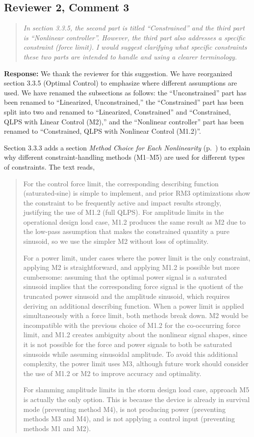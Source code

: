 \documentclass[11pt]{article}
\newcommand{\rcomment}[2]{\subsection*{#1}\begin{quote}\itshape #2\end{quote}}
\newcommand{\response}{\noindent\textbf{Response:} }
\begin{document}
\rcomment{Reviewer 2, Comment 3}{In section 3.3.5, the second part is titled ``Constrained'' and the third part is ``Nonlinear controller''. However, the third part also addresses a specific constraint (force limit). I would suggest clarifying what specific constraints these two parts are intended to handle and using a clearer terminology.}
\response We thank the reviewer for this suggestion.
We have reorganized section 3.3.5 (Optimal Control) to emphasize where different assumptions are used. 
We have renamed the subsections as follows:
the ``Unconstrained'' part has been renamed to ``Linearized, Unconstrained,''
the ``Constrained'' part has been split into two and renamed to ``Linearized, Constrained'' and ``Constrained, QLPS with Linear Control (M2),''
and
the ``Nonlinear controller'' part has been renamed to ``Constrained, QLPS with Nonlinear Control (M1.2)''.

Section 3.3.3 adds a section \textit{Method Choice for Each Nonlinearity} (p.~\pageref{aor:sec:mfd-method-choice}) to explain why different constraint-handling methods (M1--M5) are used for different types of constraints.
The text reads,
\begin{quote}
For the control force limit, the corresponding describing function (saturated-sine) is simple to implement, and prior RM3 optimizations \citep{aor:mccabe_multidisciplinary_2022,aor:gaebele_tpl_2025,aor:mcgilton_optimal_2024} show the constraint to be frequently active and impact results strongly, justifying the use of M1.2 (full QLPS).
For amplitude limits in the operational design load case, M1.2 produces the same result as M2 due to the low-pass assumption that makes the constrained quantity a pure sinusoid, so we use the simpler M2 without loss of optimality.

For a power limit, under cases where the power limit is the only constraint, applying M2 is straightforward, and applying M1.2 is possible but more cumbersome:
assuming that the optimal power signal is a saturated sinusoid implies that the corresponding force signal is the quotient of the truncated power sinusoid and the amplitude sinusoid, which requires deriving an additional describing function.
When a power limit is applied simultaneously with a force limit, both methods break down.
M2 would be incompatible with the previous choice of M1.2 for the co-occurring force limit, and M1.2 creates ambiguity about the nonlinear signal shapes,
since it is not possible for the force and power signals to both be saturated sinusoids while assuming sinusoidal amplitude.
To avoid this additional complexity, the power limit uses M3, although future work should consider the use of M1.2 or M2 to improve accuracy and optimality.

For slamming amplitude limits in the storm design load case, approach M5 is actually the only option. 
This is because the device is already in survival mode (preventing method M4), is not producing power (preventing methods M3 and M4), and is not applying a control input (preventing methods M1 and M2).
\end{quote}
\end{document}
